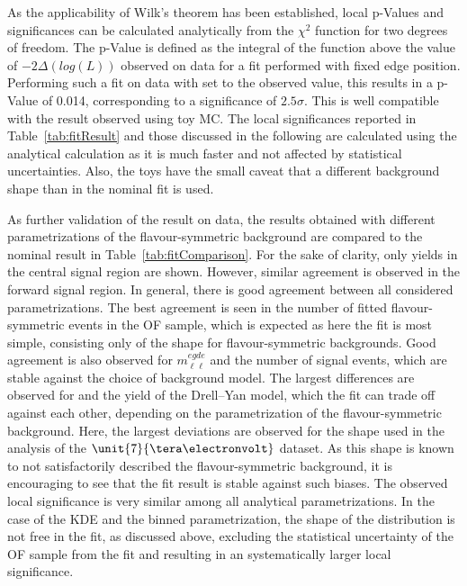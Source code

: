 As the applicability of Wilk's theorem has been established, local p-Values and significances can be calculated analytically from the $\chi^2$ function for two degrees of freedom. The p-Value is defined as the integral of the function above the value of $-2\Delta(log(L))$ observed on data for a fit performed with fixed edge position. Performing such a fit on data with \mlledge set to the observed value, this results in a p-Value of 0.014, corresponding to a significance of $2.5\sigma$. This is well compatible with the result observed using toy MC. The local significances reported in Table~\ref{tab:fitResult} and those discussed in the following are calculated using the analytical calculation as it is much faster and not affected by statistical uncertainties. Also, the toys have the small caveat that a different background shape than in the nominal fit is used. 

As further validation of the result on data, the results obtained with different parametrizations of the flavour-symmetric background are compared to the nominal result in Table~\ref{tab:fitComparison}. For the sake of clarity, only yields in the central signal region are shown. However, similar agreement is observed in the forward signal region. In general, there is good agreement between all considered parametrizations. The best agreement is seen in the number of fitted flavour-symmetric events in the OF sample, which is expected as here the fit is most simple, consisting only of the shape for flavour-symmetric backgrounds. Good agreement is also observed for $m_{\ell\ell}^{egde}$ and the number of signal events, which are stable against the choice of background model. The largest differences are observed for \Rsfof and the yield of the Drell--Yan model, which the fit can trade off against each other, depending on the parametrization of the flavour-symmetric background. Here, the largest deviations are observed for the shape used in the analysis of the $\unit{7}{\tera\electronvolt}$ dataset. As this shape is known to not satisfactorily described the flavour-symmetric background, it is encouraging to see that the fit result is stable against such biases. The observed local significance is very similar among all analytical parametrizations. In the case of the KDE and the binned parametrization, the shape of the distribution is not free in the fit, as discussed above, excluding the statistical uncertainty of the OF sample from the fit and resulting in an systematically larger local significance. 



